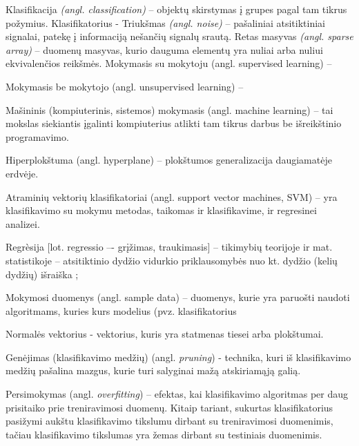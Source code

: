 Klasifikacija \textit{(angl. classification)} -- objektų skirstymas į grupes pagal tam tikrus požymius.
Klasifikatorius - 
Triukšmas \textit{(angl. noise)} -- pašaliniai atsitiktiniai signalai, patekę į informaciją nešančių signalų srautą.
Retas masyvas \textit{(angl. sparse array)} -- duomenų masyvas, kurio dauguma elementų yra nuliai arba nuliui ekvivalenčios reikšmės.
Mokymasis su mokytoju (angl. supervised learning) -- %

Mokymasis be mokytojo (angl. unsupervised learning) -- %

Mašininis\cite{mamcenko08} (kompiuterinis, sistemos\cite{martisiute08})
mokymasis (angl. machine learning) -- tai mokslas siekiantis įgalinti
kompiuterius atlikti tam tikrus darbus be išreikštinio programavimo.

Hiperplokštuma (angl. hyperplane) -- plokštumos generalizacija daugiamatėje erdvėje.

Atraminių vektorių klasifikatoriai (angl. support vector machines, SVM) -- yra
klasifikavimo su mokymu metodas, taikomas ir klasifikavime, ir regresinei
analizei.\cite{bernataviciene08}

Regrèsija [lot. regressio –- grįžimas, traukimasis] -- tikimybių teorijoje ir mat.
statistikoje – atsitiktinio dydžio vidurkio priklausomybės nuo kt. dydžio (kelių
dydžių) išraiška \cite{tzz2010};

Mokymosi duomenys (angl. sample data) -- duomenys,
kurie yra paruošti naudoti algoritmams, kuries kurs modelius (pvz.
klasifikatorius

Normalės vektorius - vektorius, kuris yra statmenas tiesei arba plokštumai.

Genėjimas (klasifikavimo medžių)  (angl. \textit{pruning}) - technika, kuri iš klasifikavimo medžių pašalina mazgus, kurie turi salyginai mažą atskiriamąją galią.

Persimokymas (angl. \textit{overfitting}) -- efektas, kai klasifikavimo algoritmas per daug prisitaiko prie treniravimosi duomenų. Kitaip tariant, sukurtas klasifikatorius pasižymi aukštu klasifikavimo tikslumu dirbant su treniravimosi duomenimis, tačiau klasifikavimo tikslumas yra žemas dirbant su testiniais duomenimis.
